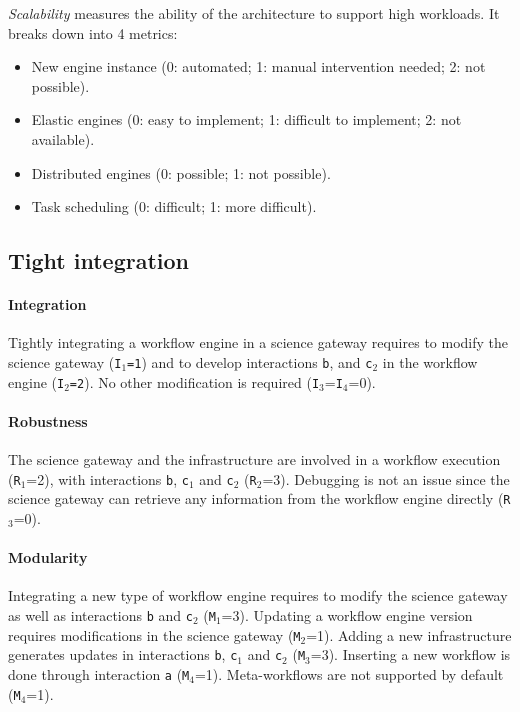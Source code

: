 \documentclass[preprint,3p,twocolumn]{elsarticle}
\begin{document}
\emph{Scalability} measures the ability of the architecture to support
high workloads. It breaks down into 4 metrics:
\begin{itemize}[itemsep=0cm]
\item New engine instance (0: automated; 1: manual intervention needed; 2: not possible).
\item Elastic engines (0: easy to implement; 1: difficult to
  implement; 2: not available).
\item Distributed engines (0: possible; 1: not possible).
\item Task scheduling (0: difficult; 1: more difficult).
\end{itemize}




\subsection{Tight integration}

\paragraph{Integration} Tightly integrating a workflow engine in a
science gateway requires to modify the science gateway
(\texttt{I$_1$=1}) and to develop interactions \texttt{b}, and
\texttt{c$_2$} in the workflow engine (\texttt{I$_2$=2}). No other
modification is required (\texttt{I$_3$}=\texttt{I$_4$}=0).

\paragraph{Robustness} The science gateway and the infrastructure are
involved in a workflow execution (\texttt{R$_1$}=2), with interactions
\texttt{b}, \texttt{c$_1$} and \texttt{c$_2$}
(\texttt{R$_2$}=3). Debugging is not an issue since the science
gateway can retrieve any information from the workflow engine
directly (\texttt{R$_3$}=0). 

\paragraph{Modularity} Integrating a new type of workflow engine
requires to modify the science gateway as well as interactions
\texttt{b} and \texttt{c$_2$} (\texttt{M$_1$}=3). Updating a workflow
engine version requires modifications in the science gateway
(\texttt{M$_2$}=1). Adding a new infrastructure generates updates in
interactions \texttt{b}, \texttt{c$_1$} and \texttt{c$_2$}
(\texttt{M$_3$}=3). Inserting a new workflow is done through
interaction \texttt{a} (\texttt{M$_4$}=1). Meta-workflows are not
supported by default (\texttt{M$_4$}=1).
\end{document}
